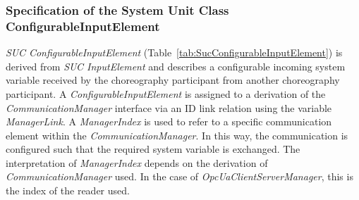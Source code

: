 \subsubsection{Specification of the System Unit Class ConfigurableInputElement}

\emph{SUC ConfigurableInputElement} (Table~\ref{tab:SucConfigurableInputElement}) is derived from \emph{SUC InputElement} and describes a configurable incoming system variable received by the choreography participant from another choreography participant. A \emph{ConfigurableInputElement} is assigned to a derivation of the \emph{CommunicationManager} interface via an ID link relation using the variable \emph{ManagerLink}. A \emph{ManagerIndex} is used to refer to a specific communication element within the \emph{CommunicationManager}. In this way, the communication is configured such that the required system variable is exchanged. The interpretation of \emph{ManagerIndex} depends on the derivation of \emph{CommunicationManager} used. In the case of \emph{OpcUaClientServerManager}, this is the index of the reader used.

